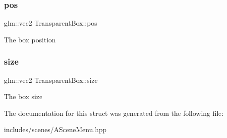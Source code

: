 \subsubsection{\texorpdfstring{pos}{pos}}
{\footnotesize\ttfamily glm\+::vec2 Transparent\+Box\+::pos}

The box position \mbox{\label{struct_transparent_box_aef4c059d7995f35b350071485cb35486}} 
\subsubsection{\texorpdfstring{size}{size}}
{\footnotesize\ttfamily glm\+::vec2 Transparent\+Box\+::size}

The box size 

The documentation for this struct was generated from the following file\+:\begin{DoxyCompactItemize}
\item 
includes/scenes/A\+Scene\+Menu.\+hpp\end{DoxyCompactItemize}
